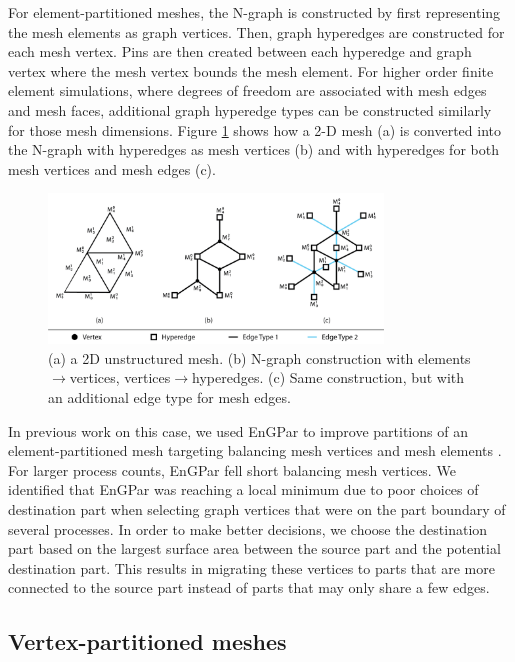 \documentclass[conference]{IEEEtran}
\begin{document}
For element-partitioned meshes, the N-graph is constructed by first representing the mesh elements
as graph vertices. Then, graph hyperedges are constructed for each mesh vertex. Pins
are then created between each hyperedge and graph vertex where the mesh vertex bounds the
mesh element. For higher order finite element simulations, where degrees of freedom are
associated with mesh edges and mesh faces, additional graph hyperedge types can be constructed
similarly for those mesh dimensions. Figure \ref{fig:mesh2graph} shows how a 2-D mesh (a)
is converted into the N-graph with hyperedges as mesh vertices (b) and with hyperedges for
both mesh vertices and mesh edges (c).

\begin{figure}[!ht]
  \centering
  \includegraphics[width=3.5in]{../figures/exampleMesh2Graph.png}
  \caption{(a) a 2D unstructured mesh. (b) N-graph construction with elements$\rightarrow$vertices, vertices$\rightarrow$hyperedges. (c) Same construction, but with an additional edge type for mesh edges.}
  \label{fig:mesh2graph}
\end{figure}

In previous work on this case, we used EnGPar to improve partitions of an
element-partitioned mesh targeting balancing mesh vertices and mesh elements \cite{engparSC17}.
For larger process counts, EnGPar fell short balancing mesh vertices.
We identified that EnGPar was reaching a local minimum due to poor choices of destination part
when selecting graph vertices that were on the part boundary of several processes. In order
to make better decisions, we choose the destination part based on the largest surface area
between the source part and the potential destination part. This results in migrating these
vertices to parts that are more connected to the source part instead of parts that may only
share a few edges.

\subsection{Vertex-partitioned meshes}
\end{document}
